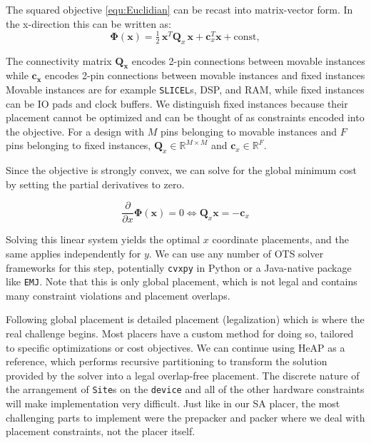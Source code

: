 The squared objective \ref{equ:Euclidian} can be recast into matrix-vector form.
In the x-direction this can be written as:
\begin{equation}
    \boldsymbol{\Phi} (\boldsymbol{x}) 
    = \tfrac{1}{2}\,\boldsymbol{x}^T \boldsymbol{Q}_x\,\boldsymbol{x} + \boldsymbol{c}_x^T \boldsymbol{x} + \text{const},
    \label{equ:quadratic}
\end{equation}

The connectivity matrix $\boldsymbol{Q_x}$ encodes 2-pin connections between movable instances while $\boldsymbol{c_x}$ encodes 2-pin connections between movable instances and fixed instances   
Movable instances are for example \texttt{SLICEL}s, DSP, and RAM, while fixed instances can be IO pads and clock buffers.
We distinguish fixed instances because their placement cannot be optimized and can be thought of as constraints encoded into the objective.
For a design with $M$ pins belonging to movable instances and $F$ pins belonging to fixed instances, $\boldsymbol{Q}_x \in {\mathbb{R}}^{M \times M}$ and $\boldsymbol{c}_x \in {\mathbb{R}}^F$.

Since the objective is strongly convex, we can solve for the global minimum cost by setting the partial derivatives to zero.

\begin{equation}
    \frac{\partial}{\partial x} \boldsymbol{\Phi} (\boldsymbol{x}) = 0 \Longleftrightarrow \boldsymbol{Q}_x \boldsymbol{x} = - \boldsymbol{c}_x
\end{equation}

Solving this linear system yields the optimal $x$ coordinate placements, and the same applies independently for $y$.
We can use any number of OTS solver frameworks for this step, potentially \texttt{cvxpy} in Python or a Java-native package like \texttt{EMJ}.
Note that this is only global placement, which is not legal and contains many constraint violations and placement overlaps.

Following global placement is detailed placement (legalization) which is where the real challenge begins.
Most placers have a custom method for doing so, tailored to specific optimizations or cost objectives.
We can continue using HeAP as a reference, which performs recursive partitioning to transform the solution provided by the solver into a legal overlap-free placement.
The discrete nature of the arrangement of \texttt{Site}s on the \texttt{device} and all of the other hardware constraints will make implementation very difficult.
Just like in our SA placer, the most challenging parts to implement were the prepacker and packer where we deal with placement constraints, not the placer itself.

